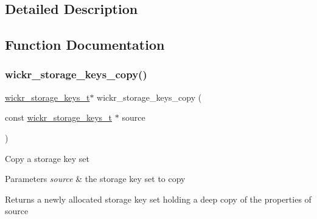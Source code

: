 \subsection{Detailed Description}


\subsection{Function Documentation}
\mbox{\label{group__wickr__storage__keys_gad6839a21bca1c28775d51deb6b7c3835}} 
\subsubsection{\texorpdfstring{wickr\+\_\+storage\+\_\+keys\+\_\+copy()}{wickr\_storage\_keys\_copy()}}
{\footnotesize\ttfamily \mbox{\hyperlink{structwickr__storage__keys}{wickr\+\_\+storage\+\_\+keys\+\_\+t}}$\ast$ wickr\+\_\+storage\+\_\+keys\+\_\+copy (\begin{DoxyParamCaption}\item[{const \mbox{\hyperlink{structwickr__storage__keys}{wickr\+\_\+storage\+\_\+keys\+\_\+t}} $\ast$}]{source }\end{DoxyParamCaption})}

Copy a storage key set


\begin{DoxyParams}{Parameters}
{\em source} & the storage key set to copy \\
\hline
\end{DoxyParams}
\begin{DoxyReturn}{Returns}
a newly allocated storage key set holding a deep copy of the properties of \textquotesingle{}source\textquotesingle{} 
\end{DoxyReturn}
\mbox{\label{group__wickr__storage__keys_gad03ddd5ea10633ca35097e5f4707d5cb}} 

